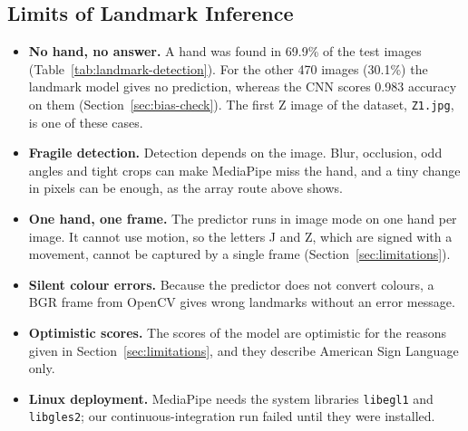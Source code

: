 \subsection{Limits of Landmark Inference}

\begin{itemize}
\item \textbf{No hand, no answer.} A hand was found in 69.9\% of the test images (Table~\ref{tab:landmark-detection}). For the other 470 images (30.1\%) the landmark model gives no prediction, whereas the CNN scores 0.983 accuracy on them (Section~\ref{sec:bias-check}). The first Z image of the dataset, \texttt{Z1.jpg}, is one of these cases.
\item \textbf{Fragile detection.} Detection depends on the image. Blur, occlusion, odd angles and tight crops can make MediaPipe miss the hand, and a tiny change in pixels can be enough, as the array route above shows.
\item \textbf{One hand, one frame.} The predictor runs in image mode on one hand per image. It cannot use motion, so the letters J and Z, which are signed with a movement, cannot be captured by a single frame (Section~\ref{sec:limitations}).
\item \textbf{Silent colour errors.} Because the predictor does not convert colours, a BGR frame from OpenCV gives wrong landmarks without an error message.
\item \textbf{Optimistic scores.} The scores of the model are optimistic for the reasons given in Section~\ref{sec:limitations}, and they describe American Sign Language only.
\item \textbf{Linux deployment.} MediaPipe needs the system libraries \texttt{libegl1} and \texttt{libgles2}; our continuous-integration run failed until they were installed.
\end{itemize}